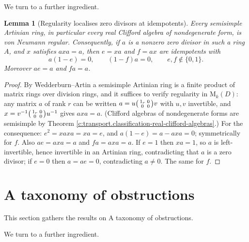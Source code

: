 \documentclass[11pt]{article}
\newtheorem{lemma}[theorem]{Lemma}
\theoremstyle{definition}
\theoremstyle{plain}
\providecommand{\Mat}{}\renewcommand{\Mat}{\mathrm{M}}
\begin{document}
We turn to a further ingredient.

\begin{lemma}[Regularity localises zero divisors at idempotents]\label{c:transport.regularity-localises-zero-divisors-idempotents}
Every semisimple Artinian ring, in particular every real Clifford algebra of nondegenerate form, is von Neumann regular. Consequently, if $a$ is a nonzero zero divisor in such a ring $A$, and $x$ satisfies $axa = a$, then $e = xa$ and $f = ax$ are idempotents with
\[
a(1 - e) = 0, \qquad (1 - f)a = 0, \qquad e, f \notin \{0, 1\}.
\]
Moreover $ae = a$ and $fa = a$.
\end{lemma}
\begin{proof}
By Wedderburn--Artin a semisimple Artinian ring is a finite product of matrix rings over division rings, and it suffices to verify regularity in $\Mat_k(D)$: any matrix $a$ of rank $r$ can be written $a = u \begin{psmallmatrix} 1_r & 0 \\ 0 & 0\end{psmallmatrix} v$ with $u, v$ invertible, and $x = v^{-1} \begin{psmallmatrix} 1_r & 0 \\ 0 & 0 \end{psmallmatrix} u^{-1}$ gives $axa = a$. (Clifford algebras of nondegenerate forms are semisimple by Theorem \ref{c:transport.classification-real-clifford-algebras}.) For the consequence: $e^2 = xaxa = xa = e$, and $a(1-e) = a - axa = 0$; symmetrically for $f$. Also $ae = axa = a$ and $fa = axa = a$. If $e = 1$ then $xa = 1$, so $a$ is left-invertible, hence invertible in an Artinian ring, contradicting that $a$ is a zero divisor; if $e = 0$ then $a = ae = 0$, contradicting $a \neq 0$. The same for $f$.

\end{proof}

\section{A taxonomy of obstructions}

This section gathers the results on A taxonomy of obstructions.

We turn to a further ingredient.
\end{document}
